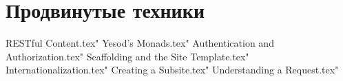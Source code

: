 
\part{Продвинутые техники}

 RESTful Content.tex"
 Yesod's Monads.tex"
 Authentication and Authorization.tex"
 Scaffolding and the Site Template.tex"
 Internationalization.tex"
 Creating a Subsite.tex"
 Understanding a Request.tex"

